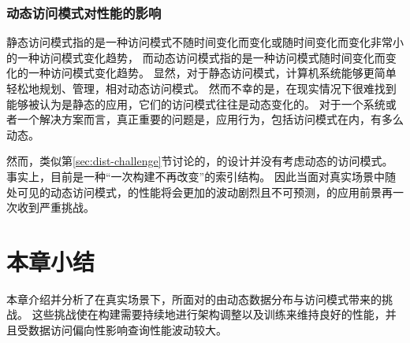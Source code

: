 
\subsubsection{动态访问模式对{\li}性能的影响}

静态访问模式指的是一种访问模式不随时间变化而变化或随时间变化而变化非常小的一种访问模式变化趋势，
而动态访问模式指的是一种访问模式随时间变化而变化的一种访问模式变化趋势。
显然，对于静态访问模式，计算机系统能够更简单轻松地规划、管理，相对动态访问模式。
然而不幸的是，在现实情况下很难找到能够被认为是静态的应用，它们的访问模式往往是动态变化的。
对于一个系统或者一个解决方案而言，真正重要的问题是，应用行为，包括访问模式在内，有多么动态。


然而，类似第\ref{sec:dist-challenge}节讨论的，{\li}的设计并没有考虑动态的访问模式。
事实上，{\li}目前是一种“一次构建不再改变”的索引结构。
因此当面对真实场景中随处可见的动态访问模式，{\li}的性能将会更加的波动剧烈且不可预测，{\li}的应用前景再一次收到严重挑战。

\section{本章小结}
本章介绍并分析了在真实场景下，{\li}所面对的由动态数据分布与访问模式带来的挑战。
这些挑战使{\li}在构建需要持续地进行架构调整以及训练来维持良好的性能，并且受数据访问偏向性影响查询性能波动较大。
